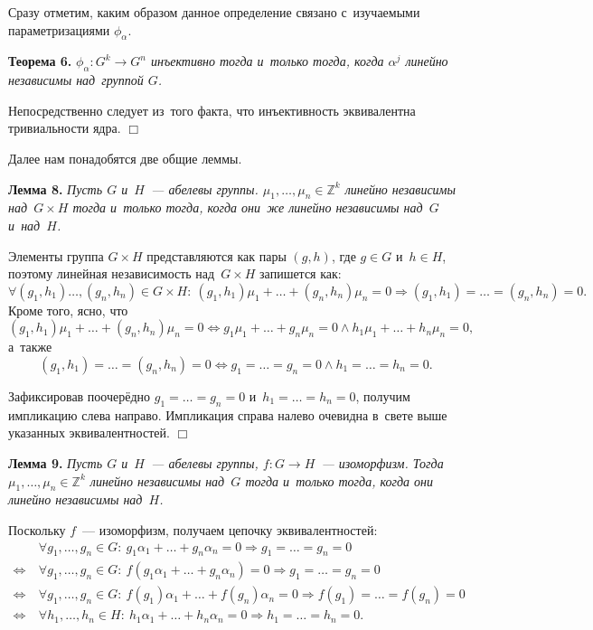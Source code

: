 \documentclass[twoside]{article}
\begin{document}
Сразу отметим, каким образом данное определение связано с~изучаемыми параметризациями $\phi_\alpha$.

\medskip\noindent\textbf{Теорема 6.}\emph{
    $\phi_\alpha : G^k \rightarrow G^n$ инъективно тогда и~только тогда, когда $\alpha^j$ линейно независимы над~группой $G$.
}\medskip

    Непосредственно следует из~того факта, что инъективность эквивалентна тривиальности ядра.
\hfill$\Box$\medskip

Далее нам понадобятся две общие леммы.

\medskip\noindent\textbf{Лемма 8.}\emph{
    Пусть $G$ и~$H$~— абелевы группы. $\mu_1, \ldots, \mu_n \in \mathbb{Z}^k$ линейно независимы над~$G \times H$
    тогда и~только тогда, когда они~же линейно независимы над~$G$ и~над~$H$.
}\medskip

    Элементы группа $G \times H$ представляются как пары $(g, h)$, где $g \in G$ и~$h \in H$, поэтому
    линейная независимость над~$G \times H$ запишется как:
    $$
        \forall (g_1, h_1) \ldots, (g_n, h_n) \in G \times H{:}\ (g_1, h_1) \mu_1 + \ldots + (g_n, h_n) \mu_n = 0 \Rightarrow (g_1, h_1) = \ldots = (g_n, h_n) = 0.
    $$
    Кроме того, ясно, что
    $$
        (g_1, h_1) \mu_1 + \ldots + (g_n, h_n) \mu_n = 0 \Leftrightarrow g_1 \mu_1 + \ldots + g_n \mu_n = 0 \wedge h_1 \mu_1 + \ldots + h_n \mu_n = 0,
    $$
    а~также
    $$
        (g_1, h_1) = \ldots = (g_n, h_n) = 0 \Leftrightarrow g_1 = \ldots = g_n = 0 \wedge h_1 = \ldots = h_n = 0.
    $$

    Зафиксировав поочерёдно $g_1 = \ldots = g_n = 0$ и~$h_1 = \ldots = h_n = 0$, получим импликацию слева направо.
    Импликация справа налево очевидна в~свете выше указанных эквивалентностей.
\hfill$\Box$\medskip

\medskip\noindent\textbf{Лемма 9.}\emph{
    Пусть $G$ и~$H$~— абелевы группы, $f : G \rightarrow H$~— изоморфизм. Тогда $\mu_1, \ldots, \mu_n \in \mathbb{Z}^k$
    линейно независимы над~$G$ тогда и~только тогда, когда они линейно независимы над~$H$.
}\medskip

    Поскольку $f$~— изоморфизм, получаем цепочку эквивалентностей:
    \begin{align*}
                       &\ \forall g_1, \ldots, g_n \in G{:}\ g_1 \alpha_1 + \ldots + g_n \alpha_n = 0 \Rightarrow g_1 = \ldots = g_n = 0 \\
        \Leftrightarrow&\ \forall g_1, \ldots, g_n \in G{:}\ f(g_1 \alpha_1 + \ldots + g_n \alpha_n) = 0 \Rightarrow g_1 = \ldots = g_n = 0 \\
        \Leftrightarrow&\ \forall g_1, \ldots, g_n \in G{:}\ f(g_1) \alpha_1 + \ldots + f(g_n) \alpha_n = 0 \Rightarrow f(g_1) = \ldots = f(g_n) = 0 \\
        \Leftrightarrow&\ \forall h_1, \ldots, h_n \in H{:}\ h_1 \alpha_1 + \ldots + h_n \alpha_n = 0 \Rightarrow h_1 = \ldots = h_n = 0.
        \tag*{$\Box$}
    \end{align*}
{}
\end{document}
